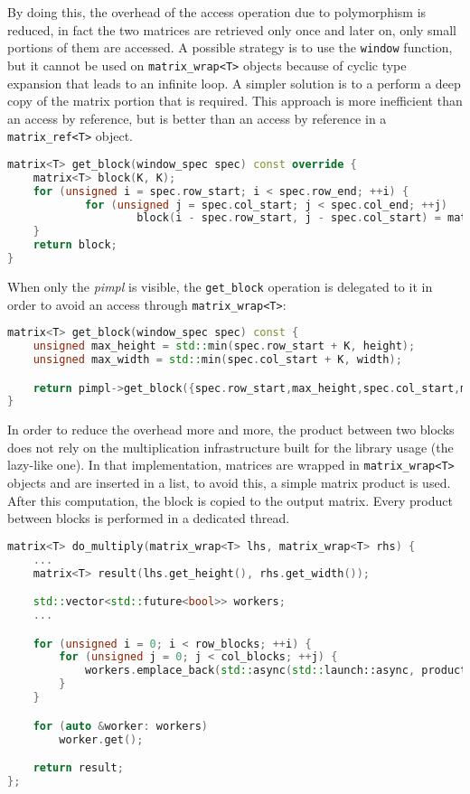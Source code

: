 \documentclass[11pt,a4paper]{article}
\begin{document}
By doing this, the overhead of the access operation due to polymorphism is reduced,
in fact the two matrices are retrieved only once and later on, only small portions of
them are accessed. A possible strategy is to use the \verb!window! function, but it
cannot be used on \verb!matrix_wrap<T>! objects because of cyclic type expansion
that leads to an infinite loop. A simpler solution is to a perform a deep copy of
the matrix portion that is required. This approach is more inefficient than an
access by reference, but is better than an access by reference in a
\verb!matrix_ref<T>! object.
\newpage
\begin{lstlisting}[language= C++]
matrix<T> get_block(window_spec spec) const override {
    matrix<T> block(K, K);
    for (unsigned i = spec.row_start; i < spec.row_end; ++i) {
            for (unsigned j = spec.col_start; j < spec.col_end; ++j)
                    block(i - spec.row_start, j - spec.col_start) = mat(i, j);
    }
    return block;
}
\end{lstlisting}
When only the \textit{pimpl} is visible, the \verb!get_block! operation is
delegated to it in order to avoid an access through \verb!matrix_wrap<T>!:
\begin{lstlisting}[language=C++]
matrix<T> get_block(window_spec spec) const {
    unsigned max_height = std::min(spec.row_start + K, height);
    unsigned max_width = std::min(spec.col_start + K, width);

    return pimpl->get_block({spec.row_start,max_height,spec.col_start,max_width});
}
\end{lstlisting}
In order to reduce the overhead more and more, the product between two blocks does
not rely on the multiplication infrastructure built for the library usage
(the lazy-like one). In that implementation, matrices are wrapped in
\verb!matrix_wrap<T>! objects and are inserted in a list, to avoid this, a simple
matrix product is used. After this computation, the block is copied to the output
matrix. Every product between blocks is performed in a dedicated thread.
\begin{lstlisting}[language=C++]
matrix<T> do_multiply(matrix_wrap<T> lhs, matrix_wrap<T> rhs) {
    ...
    matrix<T> result(lhs.get_height(), rhs.get_width());

    std::vector<std::future<bool>> workers;
    ...

    for (unsigned i = 0; i < row_blocks; ++i) {
        for (unsigned j = 0; j < col_blocks; ++j) {
            workers.emplace_back(std::async(std::launch::async, product, lhs, rhs, std::ref(result), i * K, j * K));
        }
    }

    for (auto &worker: workers)
        worker.get();

    return result;
};
\end{lstlisting}
\end{document}
